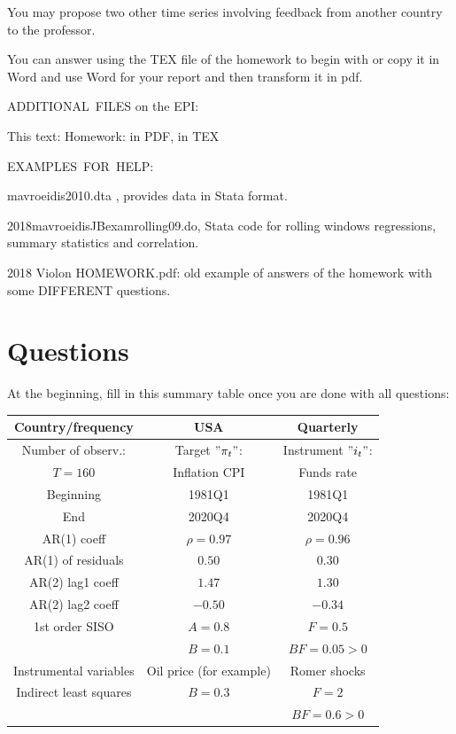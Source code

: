 \documentclass[12pt,a4paper]{article}%
\begin{document}
You may propose two other time series involving feedback from another country
to the professor.

You can answer using the TEX file of the homework to begin with or copy it in
Word and use Word for your report and then transform it in pdf.

ADDITIONAL\ FILES on the EPI:

This text: Homework: in PDF, in TEX

EXAMPLES\ FOR\ HELP:

mavroeidis2010.dta , provides data in Stata format.

2018mavroeidisJBexamrolling09.do, Stata code for rolling windows regressions,
summary statistics and correlation.

2018 Violon HOMEWORK.pdf: old example of answers of the homework with some
DIFFERENT questions.

\section{Questions}

\begin{enumerate}
At the beginning, fill in this summary table once you are done with all questions:
\end{enumerate}%

\begin{tabular}
[t]{|c|c|c|}\hline
Country/frequency & USA & Quarterly\\\hline
Number of observ.: & Target $"\pi_{t}"$: & Instrument $"i_{t}"$:\\\hline
$T=160$ & Inflation CPI & Funds rate\\\hline
Beginning & 1981Q1 & 1981Q1\\\hline
End & 2020Q4 & 2020Q4\\\hline
AR(1) coeff & $\rho=0.97$ & $\rho=0.96$\\\hline
AR(1) of residuals & $0.50$ & $0.30$\\\hline
AR(2) lag1 coeff & $1.47$ & $1.30$\\\hline
AR(2) lag2 coeff & $-0.50$ & $-0.34$\\\hline
1st order SISO & $A=0.8$ & $F=0.5$\\\hline
& $B=0.1$ & $BF=0.05>0$\\\hline
Instrumental variables & Oil price (for example) & Romer shocks\\\hline
Indirect least squares & $B=0.3$ & $F=2$\\\hline
&  & $BF=0.6>0$\\\hline
\end{tabular}
\end{document}
